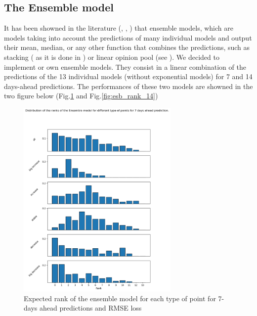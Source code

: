 \subsection{The Ensemble model}

It has been showned in the literature (\cite{cramer2022evaluation}, \cite{reich2019accuracy}, \cite{howerton2023evaluation}) that ensemble models, which are models taking into account the predictions of many individual models and output their mean, median, or any other function that combines the predictions, such as stacking ( as it is done in \cite{reich2019accuracy} ) or linear opinion pool (see \cite{howerton2023evaluation}).
We decided to implement or own ensemble models. 
They consist in a linear combination of the predictions of the 13 individual models (without exponential models) for 7 and 14 days-ahead predictions.
The performances of these two models are showned in the two figure below (Fig.\ref{fig:esb_rank_7} and Fig.\ref{fig:esb_rank_14})

\begin{figure}
    \centering
    \includegraphics[width=0.7\textwidth]{figures/esb_rank_7.png}
    \caption{Expected rank of the ensemble model for each type of point for 7-days ahead predictions and RMSE loss}
    \label{fig:esb_rank_7}
\end{figure}

